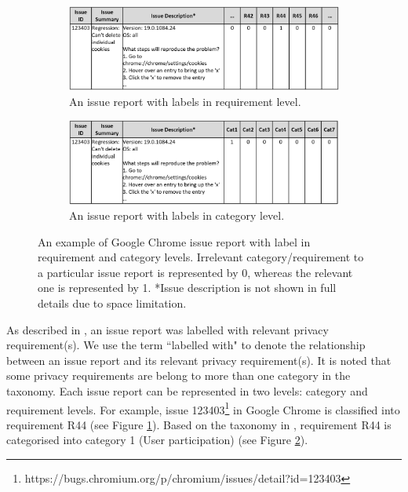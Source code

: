 \begin{figure}[ht]
	\centering
	\begin{subfigure}[b]{0.8\textwidth}
		\includegraphics[width=\textwidth]{"Figures/issue_with_reqlabel"}
		\caption{An issue report with labels in requirement level.}
		\label{fig:issue-with-reqlabel}
	\end{subfigure}
	\hfill
	\begin{subfigure}[b]{0.8\textwidth}
		\includegraphics[width=\textwidth]{"Figures/issue_with_catlabel"}
		\caption{An issue report with labels in category level.}
		\label{fig:issue-with-catlabel}
	\end{subfigure}
	\caption{An example of Google Chrome issue report with label in requirement and category levels. Irrelevant category/requirement to a particular issue report is represented by 0, whereas the relevant one is represented by 1. *Issue description is not shown in full details due to space limitation.}
	\label{fig:issue-with-label}
\end{figure}

As described in \cite{Sangaroonsilp2023}, an issue report was labelled with relevant privacy requirement(s). We use the term ``labelled with" to denote the relationship between an issue report and its relevant privacy requirement(s). It is noted that some privacy requirements are belong to more than one category in the taxonomy. Each issue report can be represented in two levels: category and requirement levels. For example, issue 123403\footnote{https://bugs.chromium.org/p/chromium/issues/detail?id=123403} in Google Chrome is classified into requirement R44 (see Figure \ref{fig:issue-with-reqlabel}). Based on the taxonomy in \cite{Sangaroonsilp2023}, requirement R44 is categorised into category 1 (User participation) (see Figure \ref{fig:issue-with-catlabel}).

